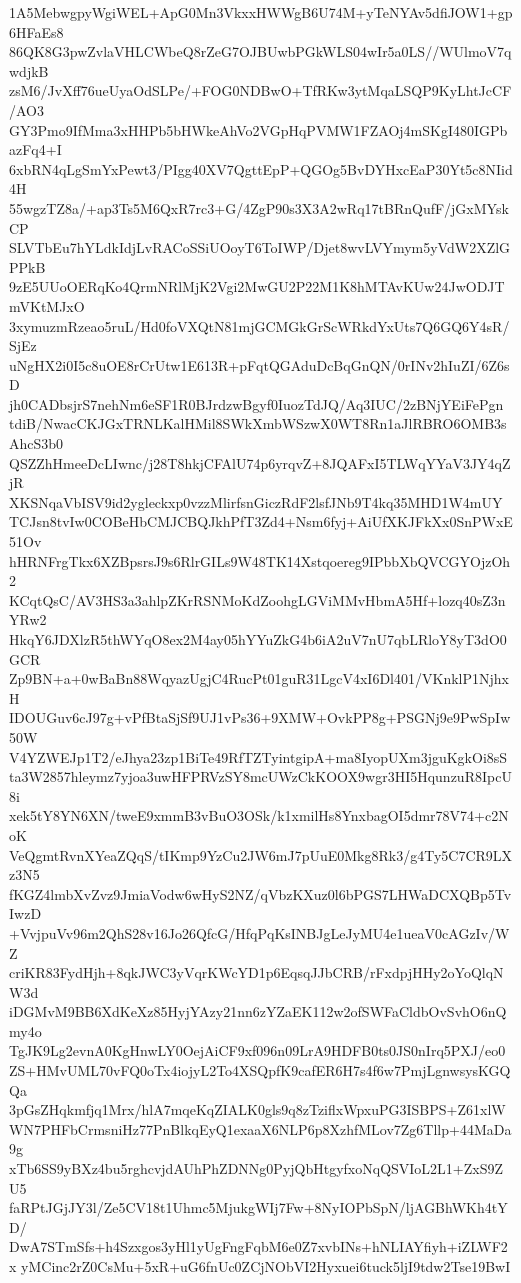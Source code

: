 1A5MebwgpyWgiWEL+ApG0Mn3VkxxHWWgB6U74M+yTeNYAv5dfiJOW1+gp6HFaEs8
86QK8G3pwZvlaVHLCWbeQ8rZeG7OJBUwbPGkWLS04wIr5a0LS//WUlmoV7qwdjkB
zsM6/JvXff76ueUyaOdSLPe/+FOG0NDBwO+TfRKw3ytMqaLSQP9KyLhtJcCF/AO3
GY3Pmo9IfMma3xHHPb5bHWkeAhVo2VGpHqPVMW1FZAOj4mSKgI480IGPbazFq4+I
6xbRN4qLgSmYxPewt3/PIgg40XV7QgttEpP+QGOg5BvDYHxcEaP30Yt5c8NIid4H
55wgzTZ8a/+ap3Ts5M6QxR7rc3+G/4ZgP90s3X3A2wRq17tBRnQufF/jGxMYskCP
SLVTbEu7hYLdkIdjLvRACoSSiUOoyT6ToIWP/Djet8wvLVYmym5yVdW2XZlGPPkB
9zE5UUoOERqKo4QrmNRlMjK2Vgi2MwGU2P22M1K8hMTAvKUw24JwODJTmVKtMJxO
3xymuzmRzeao5ruL/Hd0foVXQtN81mjGCMGkGrScWRkdYxUts7Q6GQ6Y4sR/SjEz
uNgHX2i0I5c8uOE8rCrUtw1E613R+pFqtQGAduDcBqGnQN/0rINv2hIuZI/6Z6sD
jh0CADbsjrS7nehNm6eSF1R0BJrdzwBgyf0IuozTdJQ/Aq3IUC/2zBNjYEiFePgn
tdiB/NwacCKJGxTRNLKalHMil8SWkXmbWSzwX0WT8Rn1aJlRBRO6OMB3sAhcS3b0
QSZZhHmeeDcLIwnc/j28T8hkjCFAlU74p6yrqvZ+8JQAFxI5TLWqYYaV3JY4qZjR
XKSNqaVbISV9id2ygleckxp0vzzMlirfsnGiczRdF2lsfJNb9T4kq35MHD1W4mUY
TCJsn8tvIw0COBeHbCMJCBQJkhPfT3Zd4+Nsm6fyj+AiUfXKJFkXx0SnPWxE51Ov
hHRNFrgTkx6XZBpsrsJ9s6RlrGILs9W48TK14Xstqoereg9IPbbXbQVCGYOjzOh2
KCqtQsC/AV3HS3a3ahlpZKrRSNMoKdZoohgLGViMMvHbmA5Hf+lozq40sZ3nYRw2
HkqY6JDXlzR5thWYqO8ex2M4ay05hYYuZkG4b6iA2uV7nU7qbLRloY8yT3dO0GCR
Zp9BN+a+0wBaBn88WqyazUgjC4RucPt01guR31LgcV4xI6Dl401/VKnklP1NjhxH
IDOUGuv6cJ97g+vPfBtaSjSf9UJ1vPs36+9XMW+OvkPP8g+PSGNj9e9PwSpIw50W
V4YZWEJp1T2/eJhya23zp1BiTe49RfTZTyintgipA+ma8IyopUXm3jguKgkOi8sS
ta3W2857hleymz7yjoa3uwHFPRVzSY8mcUWzCkKOOX9wgr3HI5HqunzuR8IpcU8i
xek5tY8YN6XN/tweE9xmmB3vBuO3OSk/k1xmilHs8YnxbagOI5dmr78V74+c2NoK
VeQgmtRvnXYeaZQqS/tIKmp9YzCu2JW6mJ7pUuE0Mkg8Rk3/g4Ty5C7CR9LXz3N5
fKGZ4lmbXvZvz9JmiaVodw6wHyS2NZ/qVbzKXuz0l6bPGS7LHWaDCXQBp5TvIwzD
+VvjpuVv96m2QhS28v16Jo26QfcG/HfqPqKsINBJgLeJyMU4e1ueaV0cAGzIv/WZ
criKR83FydHjh+8qkJWC3yVqrKWcYD1p6EqsqJJbCRB/rFxdpjHHy2oYoQlqNW3d
iDGMvM9BB6XdKeXz85HyjYAzy21nn6zYZaEK112w2ofSWFaCldbOvSvhO6nQmy4o
TgJK9Lg2evnA0KgHnwLY0OejAiCF9xf096n09LrA9HDFB0ts0JS0nIrq5PXJ/eo0
ZS+HMvUML70vFQ0oTx4iojyL2To4XSQpfK9cafER6H7s4f6w7PmjLgnwsysKGQQa
3pGsZHqkmfjq1Mrx/hlA7mqeKqZIALK0gls9q8zTziflxWpxuPG3ISBPS+Z61xlW
WN7PHFbCrmsniHz77PnBlkqEyQ1exaaX6NLP6p8XzhfMLov7Zg6Tllp+44MaDa9g
xTb6SS9yBXz4bu5rghcvjdAUhPhZDNNg0PyjQbHtgyfxoNqQSVIoL2L1+ZxS9ZU5
faRPtJGjJY3l/Ze5CV18t1Uhmc5MjukgWIj7Fw+8NyIOPbSpN/ljAGBhWKh4tYD/
DwA7STmSfs+h4Szxgos3yHl1yUgFngFqbM6e0Z7xvbINs+hNLIAYfiyh+iZLWF2x
yMCinc2rZ0CsMu+5xR+uG6fnUc0ZCjNObVI2Hyxuei6tuck5ljI9tdw2Tse19BwI
